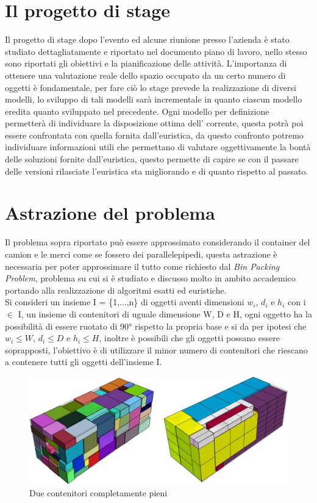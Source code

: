 \section{Il progetto di stage}
Il progetto di stage dopo l'evento  ed alcune riunione presso l'azienda è stato studiato dettagliatamente e riportato nel documento piano di lavoro, nello stesso sono riportati gli obiettivi e la pianificazione delle attività.
L'importanza di ottenere una valutazione reale dello spazio occupato da un certo numero di oggetti è fondamentale, per fare ciò lo stage prevede la realizzazione di diversi modelli, lo sviluppo di tali modelli sarà incrementale in quanto ciascun modello eredita quanto sviluppato nel precedente. Ogni modello per definizione permetterà di individuare la disposizione ottima dell' corrente, questa potrà poi essere confrontata con quella fornita dall'euristica, da questo confronto potremo individuare informazioni utili che permettano di valutare oggettivamente la bontà delle soluzioni fornite dall'euristica, questo permette di capire se con il passare delle versioni rilasciate l'euristica sta migliorando e di quanto rispetto al passato.

\section{Astrazione del problema}
Il problema sopra riportato può essere approssimato considerando il container del camion e le merci come se fossero dei parallelepipedi, questa astrazione è necessaria per poter approssimare il tutto come richiesto dal \textit{Bin Packing Problem}, problema su cui si è studiato e discusso molto in ambito accademico portando alla realizzazione di algoritmi esatti ed euristiche.\\ 
Si consideri un insieme I = \{1,...,n\} di oggetti aventi dimensioni $w_{i}$, $d_{i}$ e $h_{i}$ con i $\in$ I, un insieme di contenitori di uguale dimensione W, D e H, ogni oggetto ha la possibilità di essere ruotato di 90° rispetto la propria base e si da per ipotesi che $w_{i} \leq W$, $d_{i} \leq D$ e $h_{i} \leq H$, inoltre è possibili che gli oggetti possano essere soprapposti, l'obiettivo è di utilizzare il minor numero di contenitori che riescano a contenere tutti gli oggetti dell'insieme I.\\
\begin{figure}[!h]
    \begin{center} \includegraphics[scale=0.8]{figures/bin_packing}
        \caption[Bin packing figures]{Due contenitori completamente pieni}  
        \label{fig:myInlineFigure}
    \end{center}
\end{figure}
\newpage
